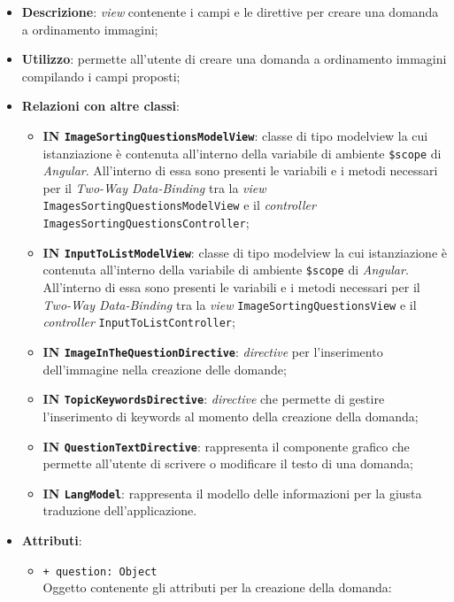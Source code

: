 \begin{itemize}
	\item \textbf{Descrizione}: \textit{view} contenente i campi e le direttive per creare una domanda a ordinamento immagini;
	\item \textbf{Utilizzo}: permette all'utente di creare una domanda a ordinamento immagini compilando i campi proposti;
	\item \textbf{Relazioni con altre classi}:
	\begin{itemize}
		\item \textbf{IN \texttt{ImageSortingQuestionsModelView}}: classe di tipo modelview la cui istanziazione è contenuta all'interno della variabile di ambiente \texttt{\$scope} di \textit{Angular}. All'interno di essa sono presenti le variabili e i metodi necessari per il \textit{Two-Way Data-Binding} tra la \textit{view} \texttt{ImagesSortingQuestionsModelView} e il \textit{controller}\\ \texttt{ImagesSortingQuestionsController};
		\item \textbf{IN \texttt{InputToListModelView}}: classe di tipo modelview la cui istanziazione è contenuta all'interno della variabile di ambiente \texttt{\$scope} di \textit{Angular}. All'interno di essa sono presenti le variabili e i metodi necessari per il \textit{Two-Way Data-Binding} tra la \textit{view} \texttt{ImageSortingQuestionsView} e il \textit{controller} \texttt{InputToListController};
		\item \textbf{IN \texttt{ImageInTheQuestionDirective}}: \textit{directive} per l'inserimento dell'immagine nella creazione delle domande;
		\item \textbf{IN \texttt{TopicKeywordsDirective}}: \textit{directive} che permette di gestire l'inserimento di keywords al momento della creazione della domanda;
		\item \textbf{IN \texttt{QuestionTextDirective}}: rappresenta il componente grafico che permette all'utente di scrivere o modificare il testo di una domanda;
		\item \textbf{IN \texttt{LangModel}}: rappresenta il modello delle informazioni per la giusta traduzione dell'applicazione.
	\end{itemize}
	\item \textbf{Attributi}:
	\begin{itemize}
			\item \texttt{+ question: Object} \\ Oggetto contenente gli attributi per la creazione della domanda:

\end{itemize}
\end{itemize}

